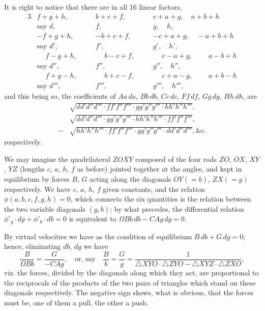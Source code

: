 \documentclass[11pt,a4paper]{book}
\begin{document}
It is right to notice that there are in all 16 linear factors,
\begin{alignat*}{3}
&f+g+h, \quad && b+c+f, \quad && c+a+g, \quad a+b+h \\
& \text{say } d, && f, && g, \quad h, \\
&-f+g+h, \quad && -b+c+f, \quad && -c+a+g, \quad -a+b+h \\
& \text{say } d', && f', && g', \quad h', \\
&\phantom{-}f-g+h, \quad && \phantom{-}b-c+f, \quad && \phantom{-}c-a+g, \quad \phantom{-}a-b+h \\
& \text{say } d'', && f'', && g'', \quad h'', \\
&\phantom{-}f+g-h, \quad && \phantom{-}b+c-f, \quad && \phantom{-}c+a-g, \quad \phantom{-}a+b-h \\
& \text{say } d''', && f''', && g''', \quad h''',
\end{alignat*}
and this being so, the coefficients of $Aa\,da$, $Bb\,db$,
$Cc\,dc$, $Ff\,df$, $Gg\,dg$, $Hh\,dh$, are
\begin{align*}
&\sqrt{dd'd''d''' \cdot ff'f''f''' \cdot gg'g''g''' \cdot hh'h''h'''}, \\
&\sqrt{dd'd''d''' \cdot gg'g''g''' \cdot hh'h''h''' \cdot ff'f''f'''}, \\
-&\sqrt{hh'h''h''' \cdot ff'f''f''' \cdot gg'g''g''' \cdot dd'd''d'''}, \&\text{c.}
\end{align*}
respectively.

We may imagine the quadrilateral $ZOXY$ composed of the four rods
$ZO$, $OX$, $XY$, $YZ$ (lengths $c$, $a$, $h$, $f$ as before) jointed
together at the angles, and kept in equilibrium by forces $B$, $G$
acting along the diagonals $OY (=b)$, $ZX (=g)$ respectively.
We have $c$, $a$, $h$, $f$ given constants, and the relation
$\phi(a,b,c,f,g,h) = 0$, which connects the six quantities is the
relation between the two variable diagonals $(g,b)$; by what precedes,
the differential relation $\phi'_g \cdot dg + \phi'_b \cdot db = 0$
is equivalent to $\Omega Bb\,db - CAg\,dg = 0$.

By virtual velocities we have as the condition of equilibrium
$B\,db + G\,dg = 0$;
hence, eliminating $db$, $dg$ we have
\[
\frac{B}{\Omega Bb} = \frac{G}{-CAg},
\quad\text{or, say}\quad
\frac{B}{b} = \frac{G}{g} = \frac{1}{\triangle XYO \cdot \triangle ZYO
- \triangle XYZ \cdot \triangle ZXO},
\]
viz. the forces, divided by the diagonals along which they act, are
proportional to the reciprocals of the products of the two pairs of
triangles which stand on these diagonals respectively.
The negative sign shows, what is obvious, that the forces must be, one
of them a pull, the other a push.
\end{document}
